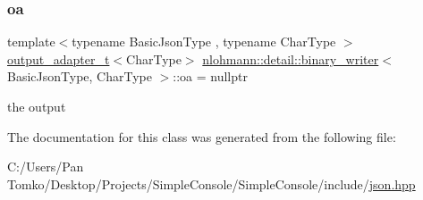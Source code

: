 \subsubsection{\texorpdfstring{oa}{oa}}
{\footnotesize\ttfamily template$<$typename Basic\+Json\+Type , typename Char\+Type $>$ \\
\mbox{\hyperlink{namespacenlohmann_1_1detail_a9b680ddfb58f27eb53a67229447fc556}{output\+\_\+adapter\+\_\+t}}$<$Char\+Type$>$ \mbox{\hyperlink{classnlohmann_1_1detail_1_1binary__writer}{nlohmann\+::detail\+::binary\+\_\+writer}}$<$ Basic\+Json\+Type, Char\+Type $>$\+::oa = nullptr\hspace{0.3cm}{\ttfamily [private]}}



the output 



The documentation for this class was generated from the following file\+:\begin{DoxyCompactItemize}
\item 
C\+:/\+Users/\+Pan Tomko/\+Desktop/\+Projects/\+Simple\+Console/\+Simple\+Console/include/\mbox{\hyperlink{json_8hpp}{json.\+hpp}}\end{DoxyCompactItemize}
